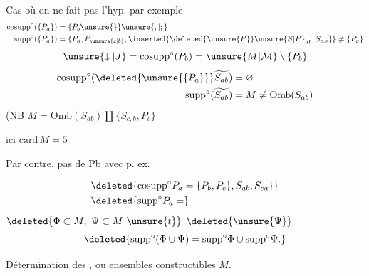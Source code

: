 Cas où on ne fait pas l'hyp. par exemple
\[
\begin{aligned}
 \mathrm{cosupp}^{\circ}(\{P_a\})&=\{P_b\unsure{\}}\unsure{,|;}\\
 \mathrm{supp}^{\circ}(\{P_a\})&=\{P_a,P_{\unsure{c|b}},\inserted{\deleted{\unsure{P}}\unsure{S|P}_{ab},S_{c,b}}\}\ne\{P_a\}
\end{aligned}
\]
\[
 \unsure{\downarrow|J}=\mathrm{cosupp}^{\circ}(P_b)=\unsure{M|\mathcal M}\setminus\{P_b\}
\]
\[
\begin{aligned}
 \mathrm{cosupp}^{\circ}(\deleted{\unsure{\{P_a\}}}\widetilde{S_{ab}})&=\varnothing\\
 \mathrm{supp}^{\circ}(\widetilde{S_{ab}})&=M\ne\mathrm{Omb}(S_{ab})
\end{aligned}
\]
(NB $M=\mathrm{Omb}(S_{ab})\amalg\{S_{c,b},P_c\}$

ici $\mathrm{card}\,M=5$

Par contre, pas de Pb avec
p. ex.

\[
\begin{aligned}
 &\deleted{\mathrm{cosupp}^{\circ}P_a=\{P_b,P_c\},S_{ab},S_{ca}\}}\\
 &\deleted{\mathrm{supp}^{\circ}P_a=}
\end{aligned}
\]
 $\deleted{\Phi\subset M,\ \Psi\subset M\ \unsure{t}}$  $\deleted{\unsure{\Psi}}$ 
\[
 \deleted{\mathrm{supp}^{\circ}(\Phi\cup\Psi)=\mathrm{supp}^{\circ}\Phi\cup\mathrm{supp}^{\circ}\Psi.}
\]

Détermination des , ou ensembles constructibles  $M$.

